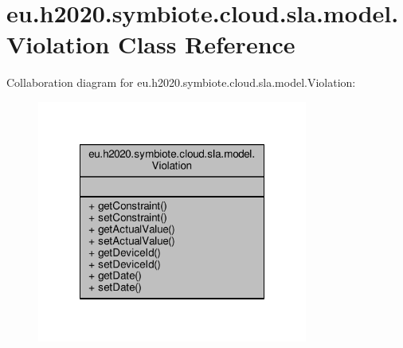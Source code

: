 \hypertarget{classeu_1_1h2020_1_1symbiote_1_1cloud_1_1sla_1_1model_1_1Violation}{}\section{eu.\+h2020.\+symbiote.\+cloud.\+sla.\+model.\+Violation Class Reference}
\label{classeu_1_1h2020_1_1symbiote_1_1cloud_1_1sla_1_1model_1_1Violation}


Collaboration diagram for eu.\+h2020.\+symbiote.\+cloud.\+sla.\+model.\+Violation\+:\nopagebreak
\begin{figure}[H]
\begin{center}
\leavevmode
\includegraphics[width=252pt]{classeu_1_1h2020_1_1symbiote_1_1cloud_1_1sla_1_1model_1_1Violation__coll__graph}
\end{center}
\end{figure}
